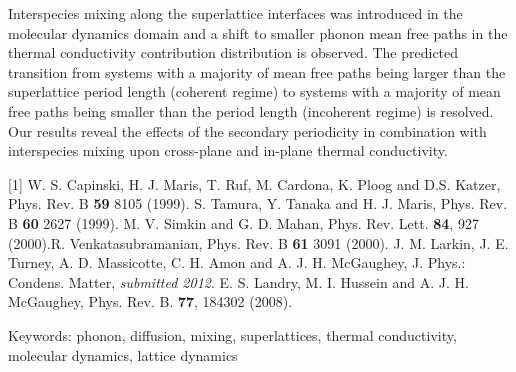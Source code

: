 \documentclass[12pt,twoside]{article}
\begin{document}
\begin{spacing}{1.1}
Interspecies mixing along the superlattice interfaces was introduced in the molecular dynamics domain and a shift to smaller phonon mean free paths in the thermal conductivity contribution distribution is observed. The predicted transition from systems with a majority of mean free paths being larger than the superlattice period length (coherent regime) to systems with a majority of mean free paths being smaller than the period length (incoherent regime) is resolved. Our results reveal the effects of the secondary periodicity in combination with interspecies mixing upon cross-plane and in-plane thermal conductivity.\newline

\end{spacing}

\begin{spacing}{1}
\footnotesize
\noindent
[1] W. S. Capinski, H. J. Maris, T. Ruf, M. Cardona, K. Ploog and D.S. Katzer, Phys. Rev. B \textbf{59} 8105 (1999). \newline
[2] S. Tamura, Y. Tanaka and H. J. Maris, Phys. Rev. B \textbf{60} 2627 (1999). \newline
[3] M. V. Simkin and G. D. Mahan, Phys. Rev. Lett. \textbf{84}, 927
(2000).\newline
[4] R. Venkatasubramanian, Phys. Rev. B \textbf{61} 3091 (2000). \newline
[5]  J. M. Larkin, J. E. Turney, A. D. Massicotte, C. H. Amon and A. J. H. McGaughey, J. Phys.: Condens. Matter, \textit{submitted 2012}. \newline
[6] E. S. Landry, M. I. Hussein and A. J. H. McGaughey, Phys. Rev. B. \textbf{77}, 184302 (2008). \newline

\noindent Keywords: phonon, diffusion, mixing, superlattices, thermal conductivity, molecular dynamics, lattice dynamics
\end{spacing}
\end{document}
